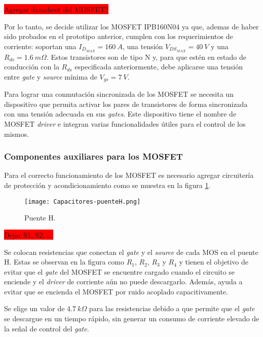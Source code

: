 \colorbox{red}{Agregar datasheet del MOSFET?}

Por lo tanto, se decide utilizar los MOSFET IPB160N04 ya que, ademas de haber sido probados en el prototipo anterior, cumplen con los requerimientos de corriente: soportan una $I_{D_{MAX}}=160\:A$, una tensión $V_{DS_{MAX}} = 40\:V$ y una $R_{ds} = 1.6 \:m \Omega$. Estos transistores son de tipo N y, para que estén en estado de conducción con la $R_{ds}$ especificada anteriormente, debe aplicarse una tensión entre \textsl{gate} y \textsl{source} mínima de $V_{gs}= 7\:V$.

Para lograr una conmutación sincronizada de los MOSFET se necesita un dispositivo que permita activar los pares de transistores de forma sincronizada con una tensión adecuada en sus \textsl{gates}. Este dispositivo tiene el nombre de MOSFET \textsl{driver} e integran varias funcionalidades útiles para el control de los mismos. 

\subsubsection{Componentes auxiliares para los MOSFET} \label{sec_auxiliares_mosfet}


Para el correcto funcionamiento de los MOSFET es necesario agregar circuitería de protección y acondicionamiento como se muestra en la figura \ref{fig:img_capacitores-puenteH}.


\begin{figure}[H]
	\centering
	\texttt{[image: Capacitores-puenteH.png]}
	\caption{Puente H.}
	\label{fig:img_capacitores-puenteH}
\end{figure}

\colorbox{red}{Dejar S1, S2, ...}

\label{sec_res-gate}

\noindent Se colocan resistencias que conectan el \textsl{gate} y el \textsl{source} de cada MOS en el puente H. Estas se observan en la figura como $R_1$, $R_2$, $R_3$ y $R_4$ y tienen el objetivo de evitar que el \textsl{gate} del MOSFET se encuentre cargado cuando el circuito se enciende y el \textsl{driver} de corriente aún no puede descargarlo. Además, ayuda a evitar que se encienda el MOSFET por ruido acoplado capacitivamente. 

\noindent Se elige un valor de $4.7 \:k\Omega$  para las resistencias debido a que permite que el \textsl{gate} se descargue en un tiempo rápido, sin generar un consumo de corriente elevado de la señal de control del \textsl{gate}.

